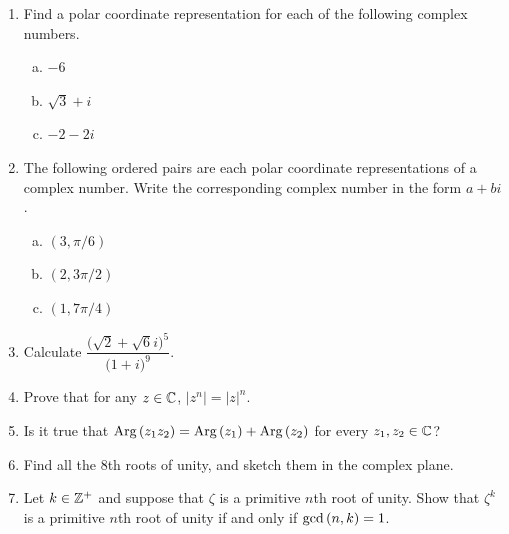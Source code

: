 \documentclass[11pt,fleqn,dvipsnames,usenames]{article}
\begin{document}
\begin{enumerate}
\item Find a polar coordinate representation for each of the following complex numbers.
\begin{multicols}{3}
\begin{enumerate}[(a)]
\item $-6$
\item $\sqrt{3} + i$
\item $-2-2i$
\end{enumerate}
\end{multicols}


\item The following ordered pairs are each polar coordinate representations of a complex number.  Write the corresponding complex number in the form $a + bi$.
\begin{multicols}{3}
\begin{enumerate}[(a)]
\item $(3,\pi/6)$
\item $(2,3\pi/2)$
\item $(1,7\pi/4)$
\end{enumerate}
\end{multicols}
\item Calculate $\dfrac{\big(\sqrt{2} + \sqrt{6}i\big)^5}{\big(1+i\big)^9}$.
\item Prove that for any $z\in\mathbb{C}$, $|z^{n}| = |z|^{n}$.
\item Is it true that $\text{Arg}\left(z_1z_2\right) = \text{Arg}\left(z_1\right) + \text{Arg}\left(z_2\right)$ for every $z_{1},z_{2}\in\mathbb{C}$?
\item Find all the $8$th roots of unity, and sketch them in the complex plane.
\item Let $k\in\mathbb{Z}^{+}$ and suppose that $\zeta$ is a primitive $n$th root of unity.  Show that $\zeta^{k}$ is a primitive $n$th root of unity if and only if $\text{gcd}\left(n,k\right) = 1$.
\end{enumerate}
\end{document}
